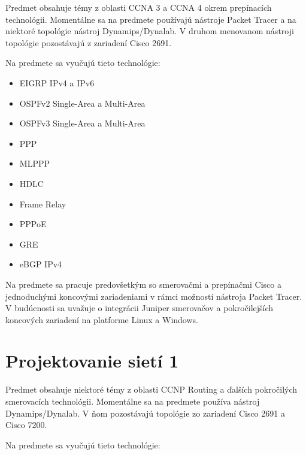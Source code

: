 Predmet obsahuje témy z oblasti CCNA 3 a CCNA 4 okrem prepínacích technológii. Momentálne sa na predmete používajú nástroje Packet Tracer a na niektoré topológie nástroj Dynamips/Dynalab. V druhom menovanom nástroji topológie pozostávajú z zariadení Cisco 2691.

Na predmete sa vyučujú tieto technológie:

\begin{itemize}[noitemsep]
    \item EIGRP IPv4 a IPv6
    \item OSPFv2 Single-Area a Multi-Area
    \item OSPFv3 Single-Area a Multi-Area
    \item PPP
    \item MLPPP
    \item HDLC
    \item Frame Relay	
    \item PPPoE
    \item GRE
    \item eBGP IPv4
\end{itemize}

Na predmete sa pracuje predovšetkým so smerovačmi a prepínačmi Cisco a jednoduchými koncovými zariadeniami v rámci možností nástroja Packet Tracer. V budúcnosti sa uvažuje o integrácii Juniper smerovačov a pokročilejších koncových zariadení na platforme Linux a Windows.




\section{Projektovanie sietí 1}

Predmet obsahuje niektoré témy z oblasti CCNP Routing a ďalších pokročilých smerovacích technológii. Momentálne sa na predmete používa nástroj Dynamips/Dynalab. V ňom pozostávajú topológie zo zariadení Cisco 2691 a Cisco 7200.

Na predmete sa vyučujú tieto technológie:

